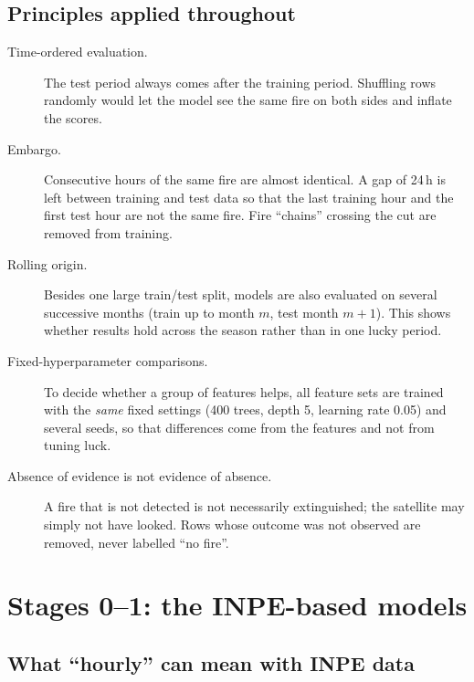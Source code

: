 \documentclass[11pt,a4paper,oneside]{report}
\begin{document}
\section{Principles applied throughout}

\begin{description}
  \item[Time-ordered evaluation.] The test period always comes after the training
        period. Shuffling rows randomly would let the model see the same fire on
        both sides and inflate the scores.
  \item[Embargo.] Consecutive hours of the same fire are almost identical. A gap
        of 24\,h is left between training and test data so that the last training
        hour and the first test hour are not the same fire. Fire
        \enquote{chains} crossing the cut are removed from training.
  \item[Rolling origin.] Besides one large train/test split, models are also
        evaluated on several successive months (train up to month $m$, test month
        $m+1$). This shows whether results hold across the season rather than
        in one lucky period.
  \item[Fixed-hyperparameter comparisons.] To decide whether a group of features
        helps, all feature sets are trained with the \emph{same} fixed settings
        (400 trees, depth 5, learning rate 0.05) and several seeds, so that
        differences come from the features and not from tuning luck.
  \item[Absence of evidence is not evidence of absence.] A fire that is not
        detected is not necessarily extinguished; the satellite may simply not
        have looked. Rows whose outcome was not observed are removed, never
        labelled \enquote{no fire}.
\end{description}

\chapter{Stages 0--1: the INPE-based models}\label{ch:inpe}

\section{What \enquote{hourly} can mean with INPE data}
\end{document}
